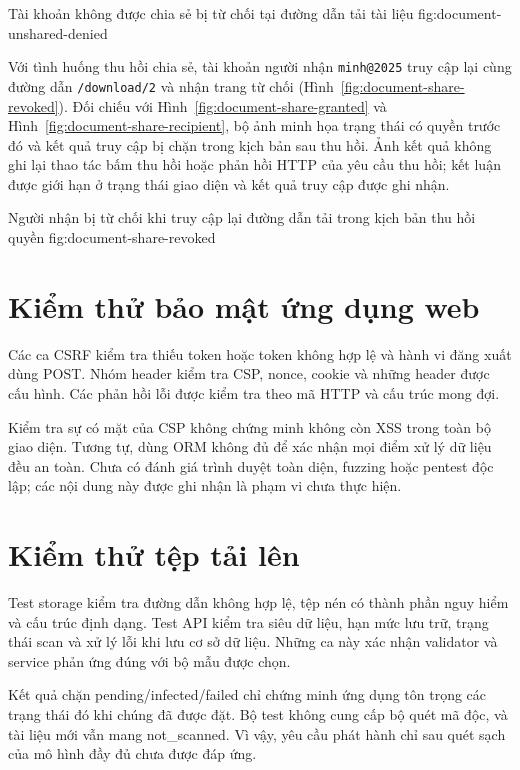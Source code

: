 {Tài khoản không được chia sẻ bị từ chối tại đường dẫn tải tài liệu}
{fig:document-unshared-denied}

Với tình huống thu hồi chia sẻ, tài khoản người nhận \texttt{minh@2025} truy cập lại cùng đường dẫn \nolinkurl{/download/2} và nhận trang từ chối (Hình~\ref{fig:document-share-revoked}). Đối chiếu với Hình~\ref{fig:document-share-granted} và Hình~\ref{fig:document-share-recipient}, bộ ảnh minh họa trạng thái có quyền trước đó và kết quả truy cập bị chặn trong kịch bản sau thu hồi. Ảnh kết quả không ghi lại thao tác bấm thu hồi hoặc phản hồi HTTP của yêu cầu thu hồi; kết luận được giới hạn ở trạng thái giao diện và kết quả truy cập được ghi nhận.

{Người nhận bị từ chối khi truy cập lại đường dẫn tải trong kịch bản thu hồi quyền}
{fig:document-share-revoked}

\clearpage

\section{Kiểm thử bảo mật ứng dụng web}
Các ca CSRF kiểm tra thiếu token hoặc token không hợp lệ và hành vi đăng xuất dùng POST. Nhóm header kiểm tra CSP, nonce, cookie và những header được cấu hình. Các phản hồi lỗi được kiểm tra theo mã HTTP và cấu trúc mong đợi.

Kiểm tra sự có mặt của CSP không chứng minh không còn XSS trong toàn bộ giao diện. Tương tự, dùng ORM không đủ để xác nhận mọi điểm xử lý dữ liệu đều an toàn. Chưa có đánh giá trình duyệt toàn diện, fuzzing hoặc pentest độc lập; các nội dung này được ghi nhận là phạm vi chưa thực hiện.

\section{Kiểm thử tệp tải lên}
Test storage kiểm tra đường dẫn không hợp lệ, tệp nén có thành phần nguy hiểm và cấu trúc định dạng. Test API kiểm tra siêu dữ liệu, hạn mức lưu trữ, trạng thái scan và xử lý lỗi khi lưu cơ sở dữ liệu. Những ca này xác nhận validator và service phản ứng đúng với bộ mẫu được chọn.

Kết quả chặn pending/infected/failed chỉ chứng minh ứng dụng tôn trọng các trạng thái đó khi chúng đã được đặt. Bộ test không cung cấp bộ quét mã độc, và tài liệu mới vẫn mang not\_scanned. Vì vậy, yêu cầu phát hành chỉ sau quét sạch của mô hình đầy đủ chưa được đáp ứng.

